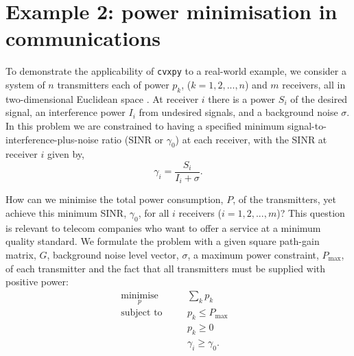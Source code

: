 \documentclass[twocolumn,secnumarabic,amssymb, nobibnotes, aps, prl,superscriptaddress]{revtex4-1}
\begin{document}
\section{Example 2: power minimisation in communications}
\noindent To demonstrate the applicability of \texttt{cvxpy} to  a real-world example, we consider a system of $n$ transmitters each of power $p_k$, ($k=1,2,...,n$) and $m$ receivers, all in two-dimensional Euclidean space \cite{shannon1949}. At receiver $i$ there is a power $S_i$ of the desired signal, an interference power $I_i$ from undesired signals, and a background noise $\sigma$. In this problem we are constrained to having a specified minimum signal-to-interference-plus-noise ratio (SINR or $\gamma_0$) at each receiver, with the SINR at receiver $i$ given by,
\begin{equation}
\gamma_i =\frac{S_i}{I_i+\sigma}.
\end{equation} 

How can we minimise the total power consumption, $P$, of the transmitters, yet achieve this minimum SINR, $\gamma_0$, for all $i$ receivers ($i = 1,2,...,m$)? This question is relevant to telecom companies who want to offer a service at a minimum quality standard. We formulate the problem with a given square path-gain matrix, $G$, background noise level vector, $\sigma$, a maximum power constraint, $P_{\text{max}}$, of each transmitter and the fact that all transmitters must be supplied with positive power:
\begin{align*}
&\underset{p}{\text{minimise}} \quad &&\sum_k p_k\\
&\text{subject to} \quad &&p_k \leqslant P_{\max}\\
& \quad &&p_k \geqslant 0\\
& \quad &&\gamma_i \geqslant \gamma_0.&&
\end{align*}
\end{document}
